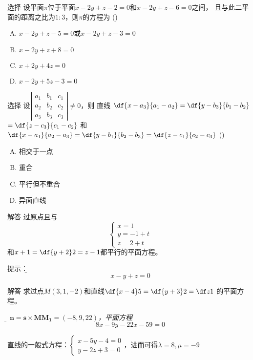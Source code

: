 \begin{frame}{选择}
	\linespread{1.3}
	\;设平面$\pi$位于平面$x-2y+z-2=0$和$x-2y+z-6=0$之间，
	且与此二平面的距离之比为$1:3$，则$\pi$的方程为
	(\underline{\;})
	\begin{enumerate}[(A)]
	  \item $x-2y+z-5=0$或$x-2y+z-3=0$
	  \item $x-2y+z+8=0$
	  \item $x+2y+4z=0$
	  \item $x-2y+5z-3=0$
	\end{enumerate}
\end{frame}

\begin{frame}{选择}
	\linespread{1.3}
	\;设$\left|\begin{array}{ccc}
	a_1 & b_1 & c_1\\ a_2 & b_2 & c_2\\ a_3 & b_3 & c_3
	\end{array}\right|\ne 0$，则
	直线
	$\df{x-a_3}{a_1-a_2}=\df{y-b_3}{b_1-b_2}$
	$=\df{z-c_3}{c_1-c_2}$
	和
	$\df{x-a_1}{a_2-a_3}=\df{y-b_1}{b_2-b_3}=\df{z-c_1}{c_2-c_3}$
	(\underline{\;})
	\begin{enumerate}[(A)]
	  \item 相交于一点
	  \item 重合
	  \item 平行但不重合
	  \item 异面直线
	\end{enumerate}
\end{frame}

\begin{frame}{解答}
	\linespread{1.2}
	\;过原点且与
	$$\left\{\begin{array}{l}
	x=1\\ y=-1+t\\ z=2+t
	\end{array}\right.$$
	和$x+1=\df{y+2}2=z-1$都平行的平面方程。
	
	\pause\alert{提示：}\it\b  
	$$x-y+z=0$$
\end{frame}

\begin{frame}{解答}
	\linespread{1.2}
	\;求过点$M(3,1,-2)$和直线$\df{x-4}5=\df{y+3}2=\df z1$
	的平面方程。
	
	\pause{}\it\b  
	$\bm{n}=\bm{s}\times\bm{MM_1}=(-8,9,22)$，平面方程
	$$8x-9y-22x-59=0$$
	
	\pause{}
	直线的一般式方程：$\left\{\begin{array}{l}x-5y-4=0\\ 
	y-2z+3=0\end{array}\right.$，进而可得$\lambda=8,\mu=-9$
\end{frame}

